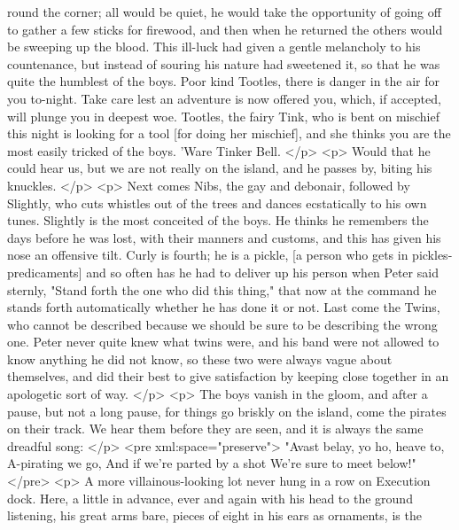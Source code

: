       round the corner; all would be quiet, he would take the opportunity of
      going off to gather a few sticks for firewood, and then when he returned
      the others would be sweeping up the blood. This ill-luck had given a
      gentle melancholy to his countenance, but instead of souring his nature
      had sweetened it, so that he was quite the humblest of the boys. Poor kind
      Tootles, there is danger in the air for you to-night. Take care lest an
      adventure is now offered you, which, if accepted, will plunge you in
      deepest woe. Tootles, the fairy Tink, who is bent on mischief this night
      is looking for a tool [for doing her mischief], and she thinks you are the
      most easily tricked of the boys. 'Ware Tinker Bell.
    </p>
    <p>
      Would that he could hear us, but we are not really on the island, and he
      passes by, biting his knuckles.
    </p>
    <p>
      Next comes Nibs, the gay and debonair, followed by Slightly, who cuts
      whistles out of the trees and dances ecstatically to his own tunes.
      Slightly is the most conceited of the boys. He thinks he remembers the
      days before he was lost, with their manners and customs, and this has
      given his nose an offensive tilt. Curly is fourth; he is a pickle, [a
      person who gets in pickles-predicaments] and so often has he had to
      deliver up his person when Peter said sternly, "Stand forth the one who
      did this thing," that now at the command he stands forth automatically
      whether he has done it or not. Last come the Twins, who cannot be
      described because we should be sure to be describing the wrong one. Peter
      never quite knew what twins were, and his band were not allowed to know
      anything he did not know, so these two were always vague about themselves,
      and did their best to give satisfaction by keeping close together in an
      apologetic sort of way.
    </p>
    <p>
      The boys vanish in the gloom, and after a pause, but not a long pause, for
      things go briskly on the island, come the pirates on their track. We hear
      them before they are seen, and it is always the same dreadful song:
    </p>
<pre xml:space="preserve">
     "Avast belay, yo ho, heave to,
     A-pirating we go,
     And if we're parted by a shot
     We're sure to meet below!"
</pre>
    <p>
      A more villainous-looking lot never hung in a row on Execution dock. Here,
      a little in advance, ever and again with his head to the ground listening,
      his great arms bare, pieces of eight in his ears as ornaments, is the
